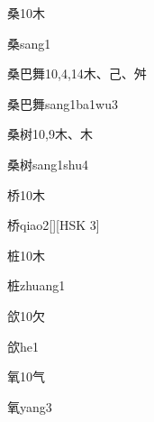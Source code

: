 \begin{entry}{桑}{10}{⽊}
  \begin{phonetics}{桑}{sang1}
  \end{phonetics}
\end{entry}

\begin{entry}{桑巴舞}{10,4,14}{⽊、⼰、⾇}
  \begin{phonetics}{桑巴舞}{sang1ba1wu3}
  \end{phonetics}
\end{entry}

\begin{entry}{桑树}{10,9}{⽊、⽊}
  \begin{phonetics}{桑树}{sang1shu4}
  \end{phonetics}
\end{entry}

\begin{entry}{桥}{10}{⽊}
  \begin{phonetics}{桥}{qiao2}[][HSK 3]
  \end{phonetics}
\end{entry}

\begin{entry}{桩}{10}{⽊}
  \begin{phonetics}{桩}{zhuang1}
  \end{phonetics}
\end{entry}

\begin{entry}{欱}{10}{⽋}
  \begin{phonetics}{欱}{he1}
  \end{phonetics}
\end{entry}

\begin{entry}{氧}{10}{⽓}
  \begin{phonetics}{氧}{yang3}
  \end{phonetics}
\end{entry}


